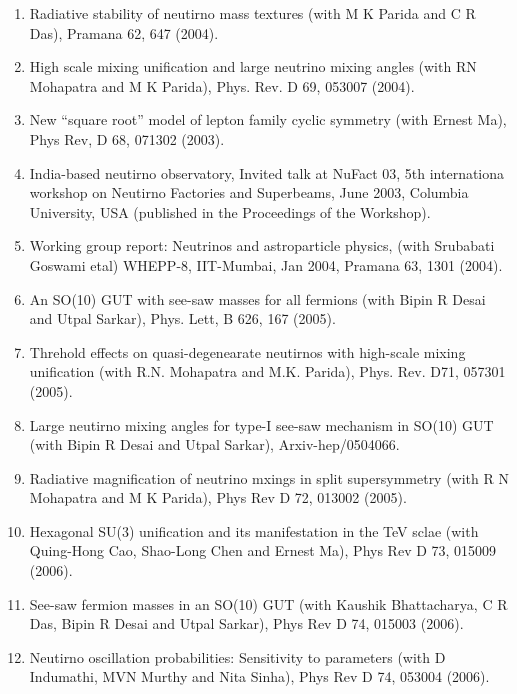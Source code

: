 \begin{enumerate}
\item Radiative stability of neutirno mass textures (with M K Parida and C R Das), Pramana 62, 647 (2004).

\item High scale mixing unification and large neutrino mixing angles (with RN Mohapatra and M K Parida), Phys. Rev. D 69, 053007 (2004).

\item New ``square root'' model of lepton family cyclic symmetry (with Ernest Ma), Phys Rev, D 68, 071302 (2003).

\item India-based neutirno observatory, Invited talk at NuFact 03, 5th internationa workshop on Neutirno Factories and Superbeams, June 2003, Columbia University, USA (published in the Proceedings of the Workshop).

\item Working group report: Neutrinos and astroparticle phy\-sics, (with Srubabati Goswami etal) WHEPP-8, IIT-Mumbai, Jan 2004, Pramana 63, 1301 (2004).

\item An SO(10) GUT with see-saw masses for all fermions (with Bipin R Desai and Utpal Sarkar), Phys. Lett, B 626, 167 (2005).

\item Threhold effects on quasi-degenearate neutirnos with high-scale mixing unification (with R.N. Mohapatra and M.K. Parida), Phys. Rev. D71, 057301 (2005).

\item Large neutirno mixing angles for type-I see-saw mechanism in SO(10) GUT (with Bipin R Desai and Utpal Sarkar), Arxiv-hep/0504066.

\item Radiative magnification of neutrino mxings in split supersymmetry (with R N Mohapatra and M K Parida), Phys Rev D 72, 013002 (2005).

\item Hexagonal SU(3) unification and its manifestation in the TeV sclae (with Quing-Hong Cao, Shao-Long Chen and Er\-nest Ma), Phys Rev D 73, 015009 (2006).

\item See-saw fermion masses in an SO(10) GUT (with Kaushik Bhattacharya, C R Das, Bipin R Desai and Utpal Sarkar), Phys Rev D 74, 015003 (2006).

\item Neutirno oscillation probabilities: Sensitivity to parame\-ters (with D Indumathi, MVN Murthy and Nita Sinha), Phys Rev D 74, 053004 (2006).


\end{enumerate}
